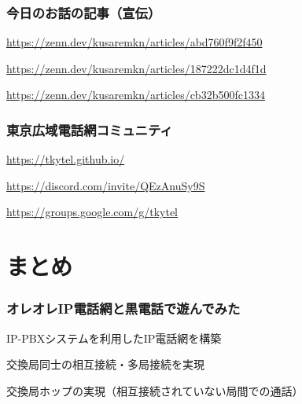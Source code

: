 \documentclass[
  lualatex,
  aspectratio=169,
  14pt
]{beamer}
\begin{document}
\begin{frame}
  \frametitle{今日のお話の記事（宣伝）}

  \begin{description}[labelwidth=\linewidth,itemsep=\zh]
    \item[いまさらVoIP網]
      {\small
      \url{https://zenn.dev/kusaremkn/articles/abd760f9f2f450}}
    \item[VoIPルータを使って黒電話をIP電話機にする]
      {\small
      \url{https://zenn.dev/kusaremkn/articles/187222dc1d4f1d}}
    \item[ICOM VE-TA10を使うためにパケットを書き換えたりする]
      {\small
      \url{https://zenn.dev/kusaremkn/articles/cb32b500fc1334}}
  \end{description}
\end{frame}

\begin{frame}
  \frametitle{東京広域電話網コミュニティ}

  \begin{description}[labelwidth=\linewidth,itemsep=\zh]
    \item[Web site]
      {\small
      \url{https://tkytel.github.io/}}
    \item[Discord]
      {\small
      \url{https://discord.com/invite/QEzAnuSy9S}}
    \item[Mailing list]
      {\small
      \url{https://groups.google.com/g/tkytel}}
  \end{description}
\end{frame}

\section{まとめ}

\begin{frame}
  \frametitle{オレオレIP電話網と黒電話で遊んでみた}

  IP-PBXシステムを利用したIP電話網を構築

  交換局同士の相互接続・多局接続を実現

  交換局ホップの実現（相互接続されていない局間での通話）

\end{frame}
\end{document}
